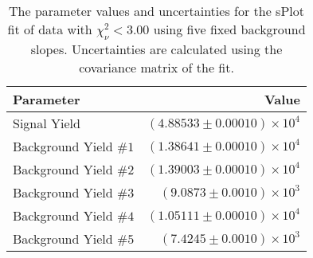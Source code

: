 
\begin{table}[ht]
    \begin{center}
        \begin{tabular}{lr}\toprule
            Parameter & Value \\\midrule
            Signal Yield & $(4.88533 \pm 0.00010) \times 10^{4}$ \\
            Background Yield $\#1$ & $(1.38641 \pm 0.00010) \times 10^{4}$ \\
            Background Yield $\#2$ & $(1.39003 \pm 0.00010) \times 10^{4}$ \\
            Background Yield $\#3$ & $(9.0873 \pm 0.0010) \times 10^{3}$ \\
            Background Yield $\#4$ & $(1.05111 \pm 0.00010) \times 10^{4}$ \\
            Background Yield $\#5$ & $(7.4245 \pm 0.0010) \times 10^{3}$ \\\bottomrule
        \end{tabular}
        \caption{The parameter values and uncertainties for the sPlot fit of data with $\chi^2_\nu < 3.00$ using five fixed background slopes. Uncertainties are calculated using the covariance matrix of the fit.}\label{tab:splot-fit-results-chisqdof-3.00-fixed-5}
    \end{center}
\end{table}
